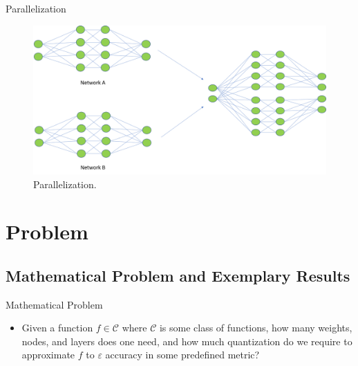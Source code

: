 \documentclass{if-beamer}
\begin{document}
\begin{frame}{Parallelization}
    \begin{figure}[htbp]
        \includegraphics[width=1\textwidth]{parallelization.png}
        \caption{ Parallelization. }
        \label{fig:figure1}
    \end{figure}
\end{frame}

\section{Problem}

\subsection{Mathematical Problem and Exemplary Results}
\begin{frame}{Mathematical Problem}
\begin{itemize}
    \item Given a function $f \in \mathcal{C}$ where $\mathcal{C}$ is some class of functions, how many weights, nodes, and layers does one need, and how much quantization do we require to approximate $f$ to $\varepsilon$ accuracy in some predefined metric?
\end{itemize}
\end{frame}
\end{document}
